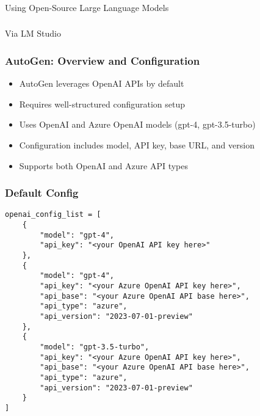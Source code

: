 \begin{frame}[fragile]\frametitle{}
\begin{center}
{\Large Using Open-Source Large Language Models}
\end{center}
\end{frame}

\begin{frame}[fragile]\frametitle{}
\begin{center}
{\Large Via LM Studio}
\end{center}
\end{frame}


\begin{frame}[fragile]\frametitle{AutoGen: Overview and Configuration}
\begin{itemize}
\item AutoGen leverages OpenAI APIs by default
\item Requires well-structured configuration setup
\item Uses OpenAI and Azure OpenAI models (gpt-4, gpt-3.5-turbo)
\item Configuration includes model, API key, base URL, and version
\item Supports both OpenAI and Azure API types
\end{itemize}
\end{frame}

\begin{frame}[fragile]\frametitle{Default Config}

\begin{lstlisting}
openai_config_list = [
    {
        "model": "gpt-4",
        "api_key": "<your OpenAI API key here>"
    },
    {
        "model": "gpt-4",
        "api_key": "<your Azure OpenAI API key here>",
        "api_base": "<your Azure OpenAI API base here>",
        "api_type": "azure",
        "api_version": "2023-07-01-preview"
    },
    {
        "model": "gpt-3.5-turbo",
        "api_key": "<your Azure OpenAI API key here>",
        "api_base": "<your Azure OpenAI API base here>",
        "api_type": "azure",
        "api_version": "2023-07-01-preview"
    }
]
\end{lstlisting}
\end{frame}


